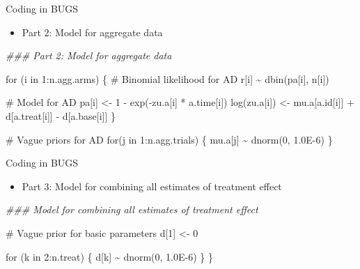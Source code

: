 \documentclass[
  ignorenonframetext,
]{beamer}
\newenvironment{Shaded}{\begin{snugshade}}{\end{snugshade}}
\newcommand{\CommentTok}[1]{\textcolor[rgb]{0.37,0.37,0.37}{#1}}
\newcommand{\ControlFlowTok}[1]{\textcolor[rgb]{0.00,0.23,0.31}{#1}}
\newcommand{\DecValTok}[1]{\textcolor[rgb]{0.68,0.00,0.00}{#1}}
\newcommand{\DocumentationTok}[1]{\textcolor[rgb]{0.37,0.37,0.37}{\textit{#1}}}
\newcommand{\ErrorTok}[1]{\textcolor[rgb]{0.68,0.00,0.00}{#1}}
\newcommand{\FloatTok}[1]{\textcolor[rgb]{0.68,0.00,0.00}{#1}}
\newcommand{\FunctionTok}[1]{\textcolor[rgb]{0.28,0.35,0.67}{#1}}
\newcommand{\NormalTok}[1]{\textcolor[rgb]{0.00,0.23,0.31}{#1}}
\newcommand{\OtherTok}[1]{\textcolor[rgb]{0.00,0.23,0.31}{#1}}
\newcommand{\SpecialCharTok}[1]{\textcolor[rgb]{0.37,0.37,0.37}{#1}}
\providecommand{\tightlist}{%
  \setlength{\itemsep}{0pt}\setlength{\parskip}{0pt}}\usepackage{longtable,booktabs,array}
\begin{document}
\begin{frame}[fragile]{Coding in BUGS}
\protect\hypertarget{coding-in-bugs-1}{}
\begin{itemize}
\tightlist
\item
  {Part 2}: Model for aggregate data
\end{itemize}

\begin{Shaded}
\begin{Highlighting}[numbers=left,,]
  \DocumentationTok{\#\#\# Part 2: Model for aggregate data}
  
  \ControlFlowTok{for}\NormalTok{ (i }\ControlFlowTok{in} \DecValTok{1}\SpecialCharTok{:}\NormalTok{n.agg.arms) \{}
    \CommentTok{\# Binomial likelihood for AD}
\NormalTok{    r[i] }\SpecialCharTok{\textasciitilde{}} \FunctionTok{dbin}\NormalTok{(pa[i], n[i])}
    
    \CommentTok{\# Model for AD}
\NormalTok{    pa[i] }\OtherTok{\textless{}{-}} \DecValTok{1} \SpecialCharTok{{-}} \FunctionTok{exp}\NormalTok{(}\SpecialCharTok{{-}}\NormalTok{zu.a[i] }\SpecialCharTok{*}\NormalTok{ a.time[i])}
    \FunctionTok{log}\NormalTok{(zu.a[i]) }\OtherTok{\textless{}{-}}\NormalTok{ mu.a[a.id[i]] }\SpecialCharTok{+}\NormalTok{ d[a.treat[i]] }\SpecialCharTok{{-}}\NormalTok{ d[a.base[i]]}
\NormalTok{  \}}
  
  \CommentTok{\# Vague priors for AD}
  \ControlFlowTok{for}\NormalTok{(j }\ControlFlowTok{in} \DecValTok{1}\SpecialCharTok{:}\NormalTok{n.agg.trials) \{}
\NormalTok{    mu.a[j] }\SpecialCharTok{\textasciitilde{}} \FunctionTok{dnorm}\NormalTok{(}\DecValTok{0}\NormalTok{, }\FloatTok{1.0E{-}6}\NormalTok{)}
\NormalTok{  \}}
\end{Highlighting}
\end{Shaded}
\end{frame}

\begin{frame}[fragile]{Coding in BUGS}
\protect\hypertarget{coding-in-bugs-2}{}
\begin{itemize}
\tightlist
\item
  {Part 3}: Model for combining all estimates of treatment effect
\end{itemize}

\begin{Shaded}
\begin{Highlighting}[]
  \DocumentationTok{\#\#\# Model for combining all estimates of treatment effect}
  
  \CommentTok{\# Vague prior for basic parameters}
\NormalTok{  d[}\DecValTok{1}\NormalTok{] }\OtherTok{\textless{}{-}} \DecValTok{0}
  
  \ControlFlowTok{for}\NormalTok{ (k }\ControlFlowTok{in} \DecValTok{2}\SpecialCharTok{:}\NormalTok{n.treat) \{}
\NormalTok{    d[k] }\SpecialCharTok{\textasciitilde{}} \FunctionTok{dnorm}\NormalTok{(}\DecValTok{0}\NormalTok{, }\FloatTok{1.0E{-}6}\NormalTok{)}
\NormalTok{  \}}
\ErrorTok{\}}
\end{Highlighting}
\end{Shaded}
\end{frame}
\end{document}
